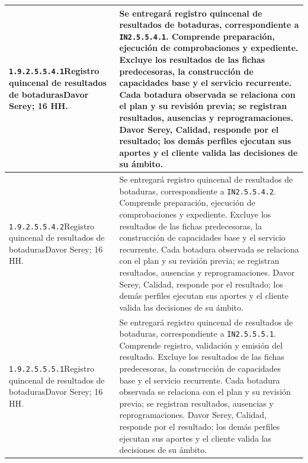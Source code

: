 \begin{longtable}{L{52mm}L{91mm}}
\texttt{1.\allowbreak{}9.\allowbreak{}2.\allowbreak{}5.\allowbreak{}5.\allowbreak{}4.\allowbreak{}1}\newline Registro quincenal de resultados de botaduras\newline Davor Serey; 16 HH. & Se entregará registro quincenal de resultados de botaduras, correspondiente a \texttt{IN2.5.5.4.1}. Comprende preparación, ejecución de comprobaciones y expediente. Excluye los resultados de las fichas predecesoras, la construcción de capacidades base y el servicio recurrente.  Cada botadura observada se relaciona con el plan y su revisión previa; se registran resultados, ausencias y reprogramaciones. Davor Serey, Calidad, responde por el resultado; los demás perfiles ejecutan sus aportes y el cliente valida las decisiones de su ámbito.\\\hline
\texttt{1.\allowbreak{}9.\allowbreak{}2.\allowbreak{}5.\allowbreak{}5.\allowbreak{}4.\allowbreak{}2}\newline Registro quincenal de resultados de botaduras\newline Davor Serey; 16 HH. & Se entregará registro quincenal de resultados de botaduras, correspondiente a \texttt{IN2.5.5.4.2}. Comprende preparación, ejecución de comprobaciones y expediente. Excluye los resultados de las fichas predecesoras, la construcción de capacidades base y el servicio recurrente.  Cada botadura observada se relaciona con el plan y su revisión previa; se registran resultados, ausencias y reprogramaciones. Davor Serey, Calidad, responde por el resultado; los demás perfiles ejecutan sus aportes y el cliente valida las decisiones de su ámbito.\\\hline
\texttt{1.\allowbreak{}9.\allowbreak{}2.\allowbreak{}5.\allowbreak{}5.\allowbreak{}5.\allowbreak{}1}\newline Registro quincenal de resultados de botaduras\newline Davor Serey; 16 HH. & Se entregará registro quincenal de resultados de botaduras, correspondiente a \texttt{IN2.5.5.5.1}. Comprende registro, validación y emisión del resultado. Excluye los resultados de las fichas predecesoras, la construcción de capacidades base y el servicio recurrente.  Cada botadura observada se relaciona con el plan y su revisión previa; se registran resultados, ausencias y reprogramaciones. Davor Serey, Calidad, responde por el resultado; los demás perfiles ejecutan sus aportes y el cliente valida las decisiones de su ámbito.\\\hline

\end{longtable}
